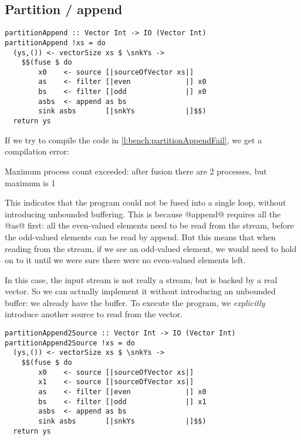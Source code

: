 \subsection{Partition / append}

\begin{lstlisting}[float,label=l:bench:partitionAppendFail,caption=Partition / append fusion failure]
partitionAppend :: Vector Int -> IO (Vector Int)
partitionAppend !xs = do
  (ys,()) <- vectorSize xs $ \snkYs ->
    $$(fuse $ do
        x0    <- source [|sourceOfVector xs|]
        as    <- filter [|even             |] x0
        bs    <- filter [|odd              |] x0
        asbs  <- append as bs
        sink asbs       [|snkYs            |]$$)
  return ys
\end{lstlisting}

If we try to compile the code in \autoref{l:bench:partitionAppendFail}, we get a compilation error:
\begin{code}
Maximum process count exceeded:
 after fusion there are 2 processes, but maximum is 1
\end{code}
This indicates that the program could not be fused into a single loop, without introducing unbounded buffering.
This is because @append@ requires all the @as@ first: all the even-valued elements need to be read from the stream, before the odd-valued elements can be read by append.
But this means that when reading from the stream, if we see an odd-valued element, we would need to hold on to it until we were sure there were no even-valued elements left.

In this case, the input stream is not really a stream, but is backed by a real vector.
So we can actually implement it without introducing an unbounded buffer: we already have the buffer.
To execute the program, we \emph{explicitly} introduce another source to read from the vector. 

\begin{lstlisting}[float,label=l:bench:partitionAppend2Source,caption=Partition / append with two sources]
partitionAppend2Source :: Vector Int -> IO (Vector Int)
partitionAppend2Source !xs = do
  (ys,()) <- vectorSize xs $ \snkYs ->
    $$(fuse $ do
        x0    <- source [|sourceOfVector xs|]
        x1    <- source [|sourceOfVector xs|]
        as    <- filter [|even             |] x0
        bs    <- filter [|odd              |] x1
        asbs  <- append as bs
        sink asbs       [|snkYs            |]$$)
  return ys
\end{lstlisting}

